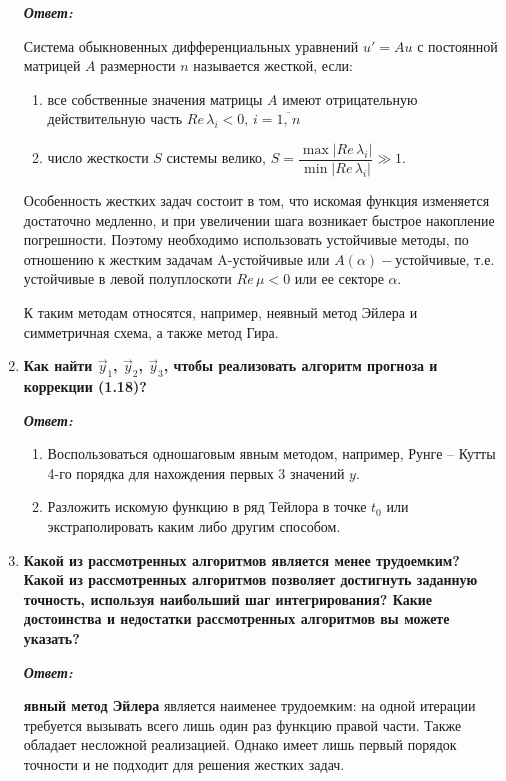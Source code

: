 \documentclass[12pt, a4paper]{article}
\newcommand{\abs}[1]{\lvert #1 \rvert}
\begin{document}
\begin{enumerate}
		\textit{\textbf{Ответ:}}

		Система обыкновенных дифференциальных уравнений $u' = Au$ с постоянной матрицей $A$ размерности $n$ называется жесткой, если: 
		\begin{enumerate}
			\item все собственные значения матрицы $A$ имеют отрицательную действительную часть $Re \, \lambda_i < 0, \, i = \overline{1, \,n}$
			\item число жесткости $S$ системы велико, $S = \dfrac{\max \abs{Re \, \lambda_i}}{\min \abs{Re \, \lambda_i}} \gg 1$.
		\end{enumerate} 

		Особенность жестких задач состоит в том, что искомая функция изменяется достаточно медленно, и при увеличении шага возникает быстрое накопление погрешности. Поэтому необходимо использовать устойчивые методы, по отношению к жестким задачам A-устойчивые или $A(\alpha)-$устойчивые, т.е. устойчивые в левой полуплоскоти $Re \, \mu < 0$ или ее секторе $\alpha$.

		К таким методам относятся, например, неявный метод Эйлера и симметричная схема, а также метод Гира.
		
		\item \textbf{Как найти $\vec{y}_1$, $\vec{y}_2$, $\vec{y}_3$, чтобы реализовать алгоритм прогноза и коррекции (1.18)?}
		\vspace*{0.2cm}
		
		\textit{\textbf{Ответ:}}
		
		\begin{enumerate}
			\item Воспользоваться одношаговым явным методом, например, Рунге -- Кутты 4-го порядка для нахождения первых 3 значений $y$.
			\item Разложить искомую функцию в ряд Тейлора в точке $t_0$ или экстраполировать каким либо другим способом. 
		\end{enumerate}
		
		\item \textbf{ Какой из рассмотренных алгоритмов является менее трудоемким? Какой из рассмотренных алгоритмов позволяет достигнуть заданную точность, используя наибольший шаг интегрирования? Какие достоинства и недостатки рассмотренных алгоритмов вы можете указать?}
		\vspace*{0.2cm}
		
		\textit{\textbf{Ответ:}}

		\textbf{явный метод Эйлера} является наименее трудоемким: на одной итерации требуется вызывать всего лишь один раз функцию правой части. Также обладает несложной реализацией. Однако имеет лишь первый порядок точности и не подходит для решения жестких задач.
                             

\end{enumerate}
\end{document}
